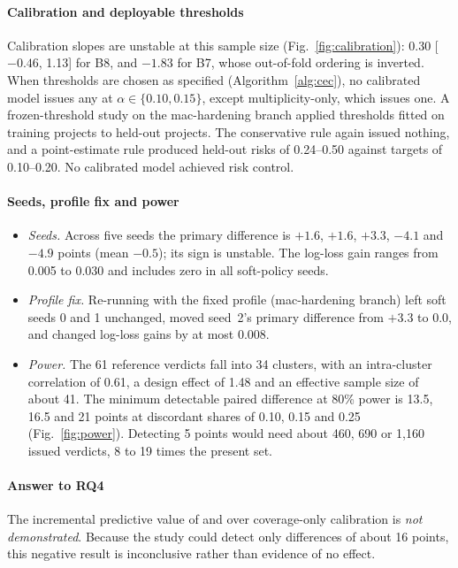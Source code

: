 \paragraph*{Calibration and deployable thresholds} Calibration slopes are unstable at this sample size (Fig.~\ref{fig:calibration}): 0.30 [$-0.46$, 1.13] for B8, and $-1.83$ for B7, whose out-of-fold ordering is inverted. When thresholds are chosen as specified (Algorithm~\ref{alg:cec}), no calibrated model issues any \NDO{} at $\alpha\in\{0.10,0.15\}$, except multiplicity-only, which issues one. A frozen-threshold study on the mac-hardening branch applied thresholds fitted on training projects to held-out projects. The conservative rule again issued nothing, and a point-estimate rule produced held-out risks of 0.24--0.50 against targets of 0.10--0.20. No calibrated model achieved risk control.

\paragraph*{Seeds, profile fix and power}\label{sec:res-robust}
\begin{itemize}
\item \emph{Seeds.} Across five seeds the primary difference is $+1.6$, $+1.6$, $+3.3$, $-4.1$ and $-4.9$ points (mean $-0.5$); its sign is unstable. The \ers{} log-loss gain ranges from 0.005 to 0.030 and includes zero in all soft-policy seeds.
\item \emph{Profile fix.} Re-running with the fixed profile (mac-hardening branch) left soft seeds 0 and 1 unchanged, moved seed~2's primary difference from $+3.3$ to $0.0$, and changed \ers{} log-loss gains by at most 0.008.
\item \emph{Power.} The 61 reference \NDO{} verdicts fall into 34 clusters, with an intra-cluster correlation of 0.61, a design effect of 1.48 and an effective sample size of about 41. The minimum detectable paired difference at 80\% power is 13.5, 16.5 and 21 points at discordant shares of 0.10, 0.15 and 0.25 (Fig.~\ref{fig:power}). Detecting 5 points would need about 460, 690 or 1{,}160 issued verdicts, 8 to 19 times the present set.
\end{itemize}

\paragraph*{Answer to RQ4} The incremental predictive value of \cec{} and \ers{} over coverage-only calibration is \emph{not demonstrated}. Because the study could detect only differences of about 16 points, this negative result is inconclusive rather than evidence of no effect.

